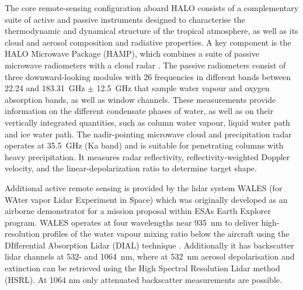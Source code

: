 \documentclass{article}
\begin{document}
The core remote-sensing configuration aboard HALO consists of a complementary suite of active and passive instruments designed to characterise the thermodynamic and dynamical structure of the tropical atmosphere, as well as its cloud and aerosol composition and radiative properties. A key component is the HALO Microwave Package (HAMP), which combines a suite of passive microwave radiometers with a cloud radar \citep{mechHAMPMicrowavePackage2014, ewaldCalibration35GHz2019}. The passive radiometers consist of three downward-looking modules with 26 frequencies in different bands between 22.24 and 183.31~GHz $\pm$ 12.5~GHz that sample water vapour and oxygen absorption bands, as well as window channels. These measurements provide information on the different condensate phases of water, as well as on their vertically integrated quantities, such as column water vapour, liquid water path and ice water path. The nadir-pointing microwave cloud and precipitation radar operates at 35.5~GHz (Ka band) and is suitable for penetrating columns with heavy precipitation. It measures radar reflectivity, reflectivity-weighted Doppler velocity, and the linear-depolarization ratio to determine target shape.

Additional active remote sensing is provided by the lidar system WALES (for WAter vapor Lidar Experiment in Space) which was originally developed as an airborne demonstrator for a mission proposal within ESAs Earth Explorer program. WALES operates at four wavelengths near 935~nm to deliver high-resolution profiles of the water vapour mixing ratio below the aircraft using the DIfferential Absorption Lidar (DIAL) technique \citep{wirthAirborneMultiwavelengthWater2009}. Additionally it has backscatter lidar channels at 532- and 1064~nm, where at 532~nm aerosol depolarisation and extinction can be retrieved using the High Spectral Resolution Lidar method (HSRL). At 1064 nm only attenuated backscatter measurements are possible. 
\end{document}
